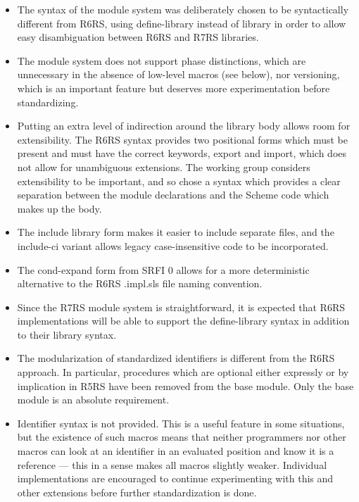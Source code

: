 \begin{itemize}
\item The syntax of the module system was deliberately chosen to be
syntactically different from R6RS, using {\cf define-library} instead of
{\cf library} in order to allow easy disambiguation between R6RS and R7RS libraries.

\item The module system does not support phase distinctions, which
are unnecessary in the absence of low-level macros (see below),
nor versioning, which is an important feature but deserves more
experimentation before standardizing.

\item Putting an extra level of indirection around the library body
allows room for extensibility. The R6RS syntax provides two positional
forms which must be present and must have the correct keywords,
{\cf export} and {\cf import}, which does not allow for unambiguous
extensions. The working group considers extensibility to be important,
and so chose a syntax which provides
a clear separation between the module declarations and the Scheme code
which makes up the body.

\item The {\cf include} library form
makes it easier to include separate files, 
and the {\cf include-ci} variant allows legacy 
case-insensitive code to be incorporated.

\item The {\cf cond-expand} form from SRFI 0 allows for a more
deterministic alternative to the R6RS {\cf .impl.sls} file naming
convention.

\item Since the R7RS module system is straightforward, it is expected
that R6RS implementations will be able to support the {\cf define-library}
syntax in addition to their {\cf library} syntax.

\item The modularization of standardized identifiers is different from the R6RS
approach. In particular, procedures which are optional either expressly
or by implication in R5RS have been removed from the base module.
Only the base module is an absolute requirement.

\item Identifier syntax is not provided. This is a useful feature in
some situations, but the existence of such macros means that neither
programmers nor other macros can look at an identifier in an evaluated
position and know it is a reference --- this in a sense makes all macros
slightly weaker. Individual implementations are encouraged to continue
experimenting with this and other extensions before further standardization is done.


\end{itemize}
